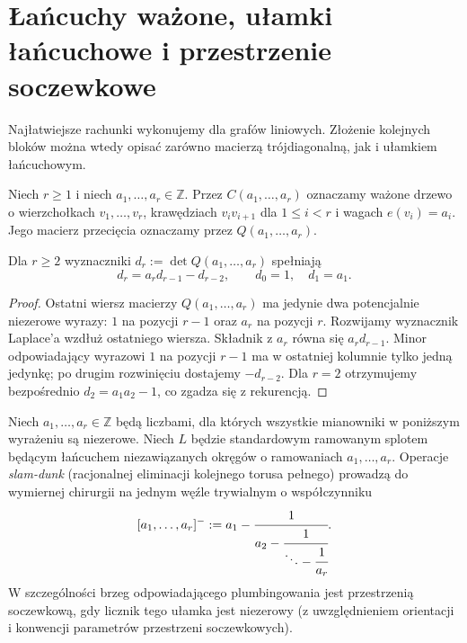 \section{Łańcuchy ważone, ułamki łańcuchowe i przestrzenie soczewkowe}
\label{sec:tg-plumbing-chains}

Najłatwiejsze rachunki wykonujemy dla grafów liniowych.
Złożenie kolejnych bloków można wtedy opisać zarówno
macierzą trójdiagonalną, jak i ułamkiem łańcuchowym.

\begin{definicja}
Niech $r\ge1$ i niech $a_1,\dots,a_r\in\mathbb Z$.
Przez $C(a_1,\dots,a_r)$ oznaczamy ważone drzewo o
wierzchołkach $v_1,\dots,v_r$, krawędziach
$v_iv_{i+1}$ dla $1\le i<r$ i wagach $e(v_i)=a_i$.
Jego macierz przecięcia oznaczamy przez $Q(a_1,\dots,a_r)$.
\end{definicja}

\begin{lemat}
Dla $r\ge2$ wyznaczniki
$d_r:=\det Q(a_1,\dots,a_r)$ spełniają
\[
d_r=a_r d_{r-1}-d_{r-2},\qquad
 d_0=1,\quad d_1=a_1.
\]
\end{lemat}
\begin{proof}
Ostatni wiersz macierzy $Q(a_1,\dots,a_r)$ ma
jedynie dwa potencjalnie niezerowe wyrazy: $1$ na pozycji
$r-1$ oraz $a_r$ na pozycji $r$. Rozwijamy wyznacznik
Laplace'a wzdłuż ostatniego wiersza. Składnik z $a_r$
równa się $a_r d_{r-1}$. Minor odpowiadający wyrazowi $1$
na pozycji $r-1$ ma w ostatniej kolumnie tylko jedną
jedynkę; po drugim rozwinięciu dostajemy $-d_{r-2}$.
Dla $r=2$ otrzymujemy bezpośrednio
$d_2=a_1a_2-1$, co zgadza się z rekurencją.
\end{proof}

\begin{stwierdzenie}
Niech $a_1,\dots,a_r\in\mathbb Z$ będą liczbami,
dla których wszystkie mianowniki w poniższym wyrażeniu
są niezerowe. Niech $L$ będzie standardowym ramowanym
splotem będącym łańcuchem niezawiązanych okręgów o
ramowaniach $a_1,\dots,a_r$. Operacje \emph{slam-dunk}
(racjonalnej eliminacji kolejnego torusa pełnego)
prowadzą do wymiernej chirurgii na jednym węźle trywialnym
o współczynniku
\[
[a_1,\dots,a_r]^-:=a_1-\cfrac1{a_2-
\cfrac1{\ddots-\cfrac1{a_r}}}.
\]
W szczególności brzeg odpowiadającego plumbingowania
jest przestrzenią soczewkową, gdy licznik tego ułamka
jest niezerowy (z uwzględnieniem orientacji i konwencji
parametrów przestrzeni soczewkowych).
\end{stwierdzenie}

